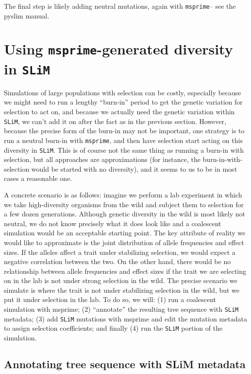 \documentclass[12pt]{article}
\newcommand{\msprime}[0]{\texttt{msprime}\xspace}
\newcommand{\slim}[0]{\texttt{SLiM}\xspace}
\begin{document}
The final step is likely adding neutral mutations,
again with \msprime -- see the pyslim manual.


\section{Using \msprime-generated diversity in \slim}

Simulations of large populations with selection can be costly,
especially because we might need to run a lengthy ``burn-in'' period
to get the genetic variation for selection to act on,
and because we actually need the genetic variation within \slim,
we can't add it on after the fact as in the previous section.
However, because the precise form of the burn-in may not be important, 
one strategy is to run a neutral burn-in with \msprime,
and then have selection start acting on this diversity in \slim.
This is of course not the same thing as running a burn-in with selection,
but all approaches are approximations
(for instance, the burn-in-with-selection would be started with no diversity),
and it seems to us to be in most cases a reasonable one.

A concrete scenario is as follows:
imagine we perform a lab experiment in which
we take high-diversity organisms from the wild
and subject them to selection for a few dozen generations.
Although genetic diversity in the wild is most likely not neutral,
we do not know precisely what it does look like
and a coalescent simulation would be an acceptable starting point.
The key attribute of reality we would like to approximate
is the joint distribution of allele frequencies and effect sizes.
If the alleles affect a trait under stabilizing selection,
we would expect a negative correlation between the two.
On the other hand, there would be no relationship between allele frequencies and effect sizes
if the trait we are selecting on in the lab is not under strong selection in the wild.
The precise scenario we simulate is where the trait
is not under stabilizing selection in the wild,
but we put it under selection in the lab.
To do so, we will:
(1) run a coalescent simulation with msprime;
(2) ``annotate'' the resulting tree sequence with \slim metadata;
(3) add \slim mutations with msprime
        and edit the mutation metadata to assign selection coefficients; and finally
(4) run the \slim portion of the simulation.


\subsection*{Annotating tree sequence with SLiM metadata}
\end{document}

